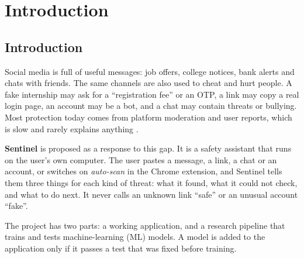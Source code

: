 \onehalfspacing
\pagestyle{fancy}
\fancyhf{}
\renewcommand{\headrulewidth}{0pt}
\cfoot{\thepage}
\chapter{Introduction}

\section{Introduction}
\noindent Social media is full of useful messages: job offers, college notices, bank alerts and chats with friends. The same channels are also used to cheat and hurt people. A fake internship may ask for a ``registration fee'' or an OTP, a link may copy a real login page, an account may be a bot, and a chat may contain threats or bullying. Most protection today comes from platform moderation and user reports, which is slow and rarely explains anything \cite{lit3}.

\noindent \textbf{Sentinel} is proposed as a response to this gap. It is a safety assistant that runs on the user's own computer. The user pastes a message, a link, a chat or an account, or switches on \emph{auto-scan} in the Chrome extension, and Sentinel tells them three things for each kind of threat: what it found, what it could not check, and what to do next. It never calls an unknown link ``safe'' or an unusual account ``fake''.

\noindent The project has two parts: a working application, and a research pipeline that trains and tests machine-learning (ML) models. A model is added to the application only if it passes a test that was fixed before training.

